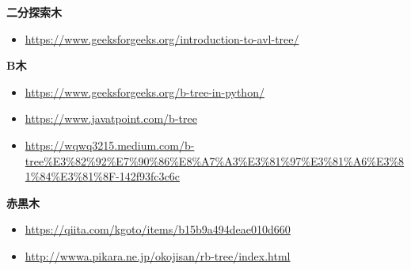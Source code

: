 \documentclass{jlreq}
\begin{document}
\noindent \textbf{二分探索木}
\begin{itemize}
  \item \url{https://www.geeksforgeeks.org/introduction-to-avl-tree/}
\end{itemize}

\noindent \textbf{B木}
\begin{itemize}
  \item \url{https://www.geeksforgeeks.org/b-tree-in-python/}
  \item \url{https://www.javatpoint.com/b-tree}
  \item \url{https://wqwq3215.medium.com/b-tree%E3%82%92%E7%90%86%E8%A7%A3%E3%81%97%E3%81%A6%E3%81%84%E3%81%8F-142f93fc3c6c}
\end{itemize}

\noindent \textbf{赤黒木}

\begin{itemize}
  \item \url{https://qiita.com/kgoto/items/b15b9a494deae010d660}
  \item \url{http://wwwa.pikara.ne.jp/okojisan/rb-tree/index.html}
\end{itemize}
\end{document}
